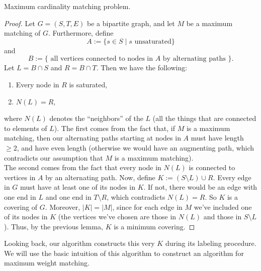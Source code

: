 \documentclass[11pt]{article}
\renewcommand{\'}{^{'}}
\begin{document}
\begin{section}{Maximum cardinality matching problem.}
\begin{proof}
	Let $G = (S,T,E)$ be a bipartite graph, and let $M$ be a maximum matching of 
	$G$. Furthermore, define 
	\[
		A := \{s\in S\; |\; s \text{ unsaturated}\} 
	\]
	and
	\[
		B := 
		\{\text{ all vertices connected to nodes in $A$ by alternating paths }\}. 
	\]
	Let $L = B\cap S$ and $R = B\cap T$. Then we have the following:
	\begin{enumerate}
		\item Every node in $R$ is saturated,
		\item $N(L) = R$,
	\end{enumerate}
	where $N(L)$ denotes the ``neighbors'' of the $L$ (all the things that are 
	connected to elements of $L$). The first comes from the fact that, if $M$ is a 
	maximum matching, then our alternating paths starting at nodes in $A$ must have 
	length $\geq 2$, and have even length (otherwise we would have an augmenting path, 
	which contradicts our assumption that $M$ is a maximum matching).\\
	The second comes from the fact that every node in $N(L)$ is connected to vertices 
	in $A$ by an alternating path. Now, define $K := (S\setminus L)\cup R$. Every edge 
	in $G$ must have at least one of its nodes in $K$. If not, there would be an 
	edge with one end in $L$ and one end in $T\setminus R$, which contradicts 
	$N(L) = R$. So $K$ is a covering of $G$. Moreover, $|K| = |M|$, since for each 
	edge in $M$ we've included one of its nodes in $K$ (the vertices we've chosen are 
	those in $N(L)$ and those in $S\setminus L$). Thus, by the previous 
	lemma, $K$ is a minimum covering.
\end{proof}

Looking back, our algorithm constructs this very $K$ during its labeling procedure. We will 
use the basic intuition of this algorithm to construct an algorithm for maximum weight 
matching.

\end{section}

\end{document}
